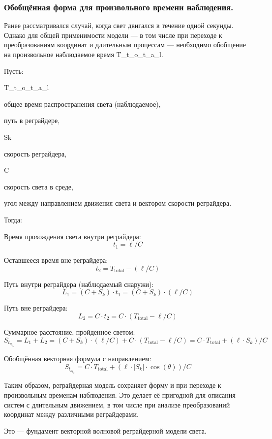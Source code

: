 \documentclass[12pt]{article}
\begin{document}
\subsubsection*{Обобщённая форма для произвольного времени наблюдения.}
Ранее рассматривался случай, когда свет двигался в течение одной секунды. Однако для общей применимости модели — в том числе при переходе к преобразованиям координат и длительным процессам — необходимо обобщение на произвольное наблюдаемое время T_t_o_t_a_l.

Пусть:
\par
T_t_o_t_a_l 
\par
общее время распространения света (наблюдаемое),
\par
\ell
\par 
путь в реграйдере,
\par
Sk 
\par
скорость реграйдера,
\par
C 
\par
скорость света в среде,
\par
\theta
\par 
угол между направлением движения света и вектором скорости реграйдера.
\par
Тогда:

Время прохождения света внутри реграйдера:
\[
t_1 = \ell / C
\]

Оставшееся время вне реграйдера:
\[
t_2 = T_{\text{total}} - (\ell / C)
\]

Путь внутри реграйдера (наблюдаемый снаружи):
\[
L_1 = (C + S_k) \cdot t_1 = (C + S_k) \cdot (\ell / C)
\]

Путь вне реграйдера:
\[
L_2 = C \cdot t_2 = C \cdot (T_{\text{total}} - \ell / C)
\]

Суммарное расстояние, пройденное светом:
\[
S_t_o_t_a_l = L_1 + L_2 = (C + S_k) \cdot (\ell / C) + C \cdot (T_{\text{total}} - \ell / C) = C \cdot T_{\text{total}} + (\ell \cdot S_k) / C
\]

Обобщённая векторная формула с направлением:
\[
S_t_o_t_a_l = C \cdot T_{\text{total}} + (\ell \cdot \left|S_k\right| \cdot \cos(\theta)) / C
\]

Таким образом, реграйдерная модель сохраняет форму и при переходе к произвольным временам наблюдения. Это делает её пригодной для описания систем с длительным движением, в том числе при анализе преобразований координат между различными реграйдерами.

Это — фундамент векторной волновой реграйдерной модели света.
\end{document}
